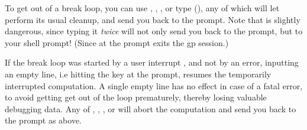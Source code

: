 To get out of a break loop, you can use , , ,
or type  (), any of which will let  perform its
usual cleanup, and send you back to the  prompt. Note that 
is slightly dangerous, since typing it \emph{twice} will not only send you
back to the  prompt, but to your shell prompt! (Since  at
the  prompt exits the gp session.)

If the break loop was started by a user interrupt , and not by
an error, inputting an empty line, i.e hitting the  key at the
 prompt, resumes the temporarily interrupted computation. A single
empty line has no effect in case of a fatal error, to avoid getting get out of
the loop prematurely, thereby losing valuable debugging data. Any of
, , , or  will abort the computation
and send you back to  the  prompt as above.

